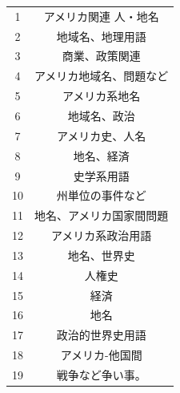 \begin{table}[h]
\begin{minipage}[t]{.45\textwidth}
\begin{center}
\begin{tabular}{|c||c|}
        1 & アメリカ関連 人・地名 \\
        2 & 地域名、地理用語 \\
        3 & 商業、政策関連 \\
        4 & アメリカ地域名、問題など \\
        5 & アメリカ系地名 \\
        6 & 地域名、政治 \\
        7 & アメリカ史、人名 \\
        8 & 地名、経済 \\
        9 & 史学系用語 \\
        10 & 州単位の事件など \\ \hline
        11 & 地名、アメリカ国家間問題 \\
        12 & アメリカ系政治用語 \\
        13 & 地名、世界史 \\
        14 & 人権史 \\
        15 & 経済 \\
        16 & 地名 \\
        17 & 政治的世界史用語 \\
        18 & アメリカ-他国間 \\
        19 & 戦争など争い事。 \\ \hline
      \end{tabular}
    \end{center}
  \end{minipage}
\end{table}


